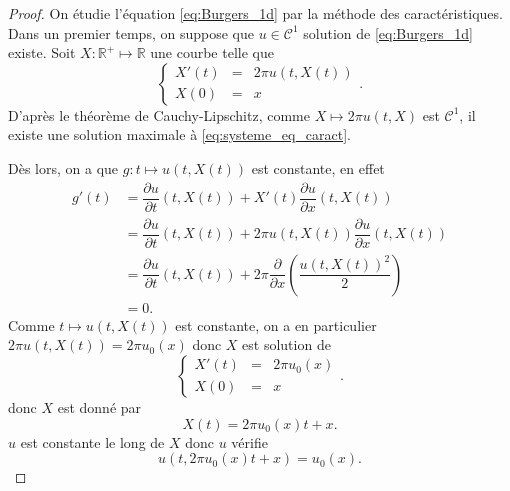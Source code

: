 \begin{proof}
On étudie l'équation \eqref{eq:Burgers_1d} par la méthode des caractéristiques. Dans un premier temps, on suppose que $u \in \mathcal{C}^1$ solution de \eqref{eq:Burgers_1d} existe. Soit $X : \mathbb{R}^+ \mapsto \mathbb{R}$ une courbe telle que
\begin{equation}
\left\lbrace
\begin{array}{rcl}
X'(t) & = & 2 \pi u (t, X(t)) \\
X(0) & = & x
\end{array}
\right. .
\label{eq:systeme_eq_caract}
\end{equation}
D'après le théorème de Cauchy-Lipschitz, comme $X \mapsto 2 \pi u (t, X)$ est $\mathcal{C}^1$, il existe une solution maximale à \eqref{eq:systeme_eq_caract}.

Dès lors, on a que $g : t \mapsto u(t,X(t))$ est constante, en effet
\begin{align*}
g'(t) & = \dfrac{\partial u}{\partial t}(t,X(t)) + X'(t) \dfrac{\partial u}{\partial x} (t,X(t)) \\
	& = \dfrac{\partial u}{\partial t}(t,X(t)) + 2 \pi u (t, X(t)) \dfrac{\partial u}{\partial x} (t,X(t)) \\
	& = \dfrac{\partial u}{\partial t}(t,X(t)) + 2 \pi  \dfrac{\partial }{\partial x} \left( \dfrac{u(t,X(t))^2}{2} \right) \\
	& = 0.
\end{align*}
Comme $t \mapsto u(t,X(t))$ est constante, on a en particulier $2 \pi u (t, X(t)) = 2 \pi u_0(x)$ donc $X$ est solution de 
\begin{equation}
\left\lbrace
\begin{array}{rcl}
X'(t) & = & 2 \pi u_0(x) \\
X(0) & = & x
\end{array}
\right. .
\label{eq:systeme_eq_caract2}
\end{equation}
donc $X$ est donné par
\begin{equation}
X(t) = 2 \pi u_0(x) t + x.
\end{equation}
$u$ est constante le long de $X$ donc $u$ vérifie
\begin{equation}
u(t,2 \pi u_0(x)t + x)=u_0(x).
\end{equation}


\end{proof}
